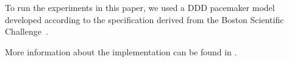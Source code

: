To run the experiments in this paper, we used a DDD pacemaker model developed according to the specification derived from the Boston Scientific Challenge~\cite{challenge}.

More information about the implementation can be found in \cite{testing}. 

%
%
%
%
%
